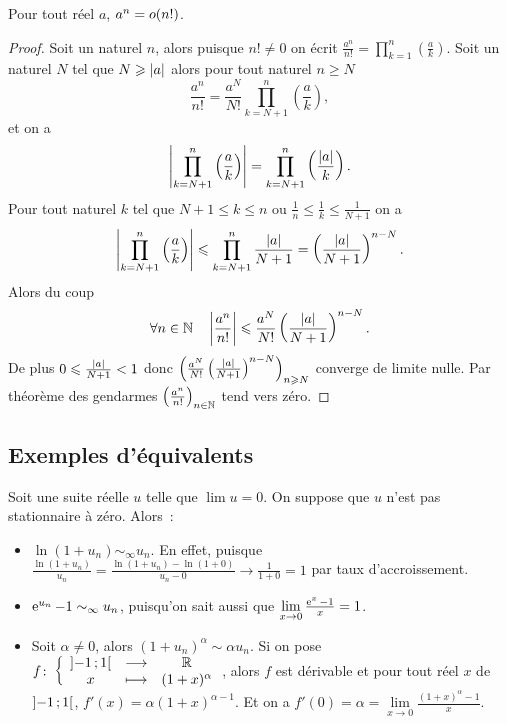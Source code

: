 \begin{prop}
  Pour tout réel \(a\), \(a^n = o\mathopen{}\left(n!\right)\).
\end{prop}
\begin{proof}
  Soit un naturel \(n\), alors puisque \(n! \neq 0\) on écrit \(\frac{a^n}{n!}=\prod_{k = 1}^n \left(\frac{a}{k}\right)\). Soit un naturel \(N\) tel que \(N \geqslant \left\lvert a\right\rvert\) alors pour tout naturel \(n \geqslant N\)
  \begin{equation}
    \frac{a^n}{n!} = \frac{a^N}{N!} \prod_{k = N+1}^n \left(\frac{a}{k}\right),
  \end{equation}
  et on a
  \begin{equation}
    \left\lvert\prod_{k = N+1}^n \left(\frac{a}{k}\right)\right\rvert = \prod_{k = N+1}^n \left(\frac{\left\lvert a\right\rvert}{k}\right).
  \end{equation}
  Pour tout naturel \(k\) tel que \(N+1 \leqslant k \leqslant n\) ou \(\frac{1}{n} \leqslant \frac{1}{k} \leqslant \frac{1}{N+1}\) on a
  \begin{equation}
    \left\lvert\prod_{k = N+1}^n \left(\frac{a}{k}\right)\right\rvert \leqslant \prod_{k = N+1}^n \frac{\left\lvert a\right\rvert}{N+1} = \left(\frac{\left\lvert a\right\rvert}{N+1}\right)^{n-N}.
  \end{equation}
  Alors du coup
  \begin{equation}
    \forall n \in \mathbb{N} \quad \left\lvert\frac{a^n}{n!}\right\rvert \leqslant \frac{a^N}{N!} \left(\frac{\left\lvert a\right\rvert}{N+1}\right)^{n-N}.
  \end{equation}
  De plus \(0 \leqslant \frac{\left\lvert a\right\rvert}{N+1} < 1\) donc \(\left(\frac{a^N}{N!} \left(\frac{\left\lvert a\right\rvert}{N+1}\right)^{n-N}\right)_{n \geqslant N}\) converge de limite nulle. Par théorème des gendarmes \(\left(\frac{a^n}{n!}\right)_{n\in \mathbb{N}}\) tend vers zéro.
\end{proof}

\subsection{Exemples d'équivalents}

Soit une suite réelle \(u\) telle que \(\lim u = 0\). On suppose que \(u\) n'est pas stationnaire à zéro. Alors~:
\begin{itemize}
    \item \(\ln(1+u_n) \sim_\infty u_n\). En effet, puisque \(\frac{\ln(1+u_n)}{u_n}= \frac{\ln(1+u_n) - \ln(1+0)}{u_n-0} \to \frac{1}{1+0} =1\) par taux d'accroissement. 
    \item \(\operatorname{e}^{u_n}-1 \sim_\infty u_n\), puisqu'on sait aussi que \(\lim\limits_{x \to 0} \frac{\operatorname{e}^{x}-1}{x} = 1\).
    \item Soit \(\alpha \neq 0\), alors \((1+u_n)^\alpha \sim \alpha u_n\). Si on pose \(f\colon \left\{\begin{array}{ccc} \left] -1 \, ;  1 \right[ & \longrightarrow &\mathbb{R}\\ x & \longmapsto & (1+x)^\alpha \end{array} \right.\), alors \(f\) est dérivable et pour tout réel \(x\) de \(\left] -1 \, ;  1 \right[\), \(f'(x) = \alpha(1+x)^{\alpha -1}\). Et on a \(f'(0) = \alpha = \lim\limits_{x \to 0}\frac{(1+x)^\alpha-1}{x}\).
\end{itemize}

